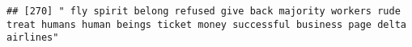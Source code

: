 \documentclass[
]{article}
\begin{document}
\begin{verbatim}
## [270] " fly spirit belong refused give back majority workers rude treat humans human beings ticket money successful business page delta airlines"                                                                                                                                                                                                                                                                                                                                                                                                                                                                                                                                                                                                                                                                                                                                                                                                                                                                                                                                                                                                                                                                                                                                                                                                                                                                                                                                                                                                                                                                                                                                                                                                                                                     

\end{verbatim}
\end{document}
